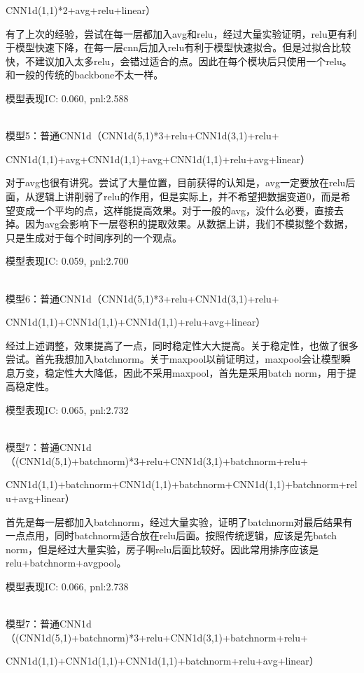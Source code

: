 \documentclass[11pt]{ctexart}
\begin{document}
CNN1d(1,1)*2+avg+relu+linear）

有了上次的经验，尝试在每一层都加入avg和relu，经过大量实验证明，relu更有利于模型快速下降，在每一层cnn后加入relu有利于模型快速拟合。但是过拟合比较快，不建议加入太多relu，会错过适合的点。因此在每个模块后只使用一个relu。和一般的传统的backbone不太一样。

模型表现{\kaishu \small IC: 0.060, pnl:2.588}

~\\
模型5：普通CNN1d（CNN1d(5,1)*3+relu+CNN1d(3,1)+relu+

CNN1d(1,1)+avg+CNN1d(1,1)+avg+CNN1d(1,1)+relu+avg+linear）

对于avg也很有讲究。尝试了大量位置，目前获得的认知是，avg一定要放在relu后面，从逻辑上讲削弱了relu的作用，但是实际上，并不希望把数据变道0，而是希望变成一个平均的点，这样能提高效果。对于一般的avg，没什么必要，直接去掉。因为avg会影响下一层卷积的提取效果。从数据上讲，我们不模拟整个数据，只是生成对于每个时间序列的一个观点。

模型表现{\kaishu \small IC: 0.059, pnl:2.700}

~\\
模型6：普通CNN1d（CNN1d(5,1)*3+relu+CNN1d(3,1)+relu+

CNN1d(1,1)+CNN1d(1,1)+CNN1d(1,1)+relu+avg+linear）

经过上述调整，效果提高了一点，同时稳定性大大提高。关于稳定性，也做了很多尝试。首先我想加入batchnorm。关于maxpool以前证明过，maxpool会让模型瞬息万变，稳定性大大降低，因此不采用maxpool，首先是采用batch norm，用于提高稳定性。

模型表现{\kaishu \small IC: 0.065, pnl:2.732}

~\\
模型7：普通CNN1d（(CNN1d(5,1)+batchnorm)*3+relu+CNN1d(3,1)+batchnorm+relu+

CNN1d(1,1)+batchnorm+CNN1d(1,1)+batchnorm+CNN1d(1,1)+batchnorm+relu+avg+linear）

首先是每一层都加入batchnorm，经过大量实验，证明了batchnorm对最后结果有一点点用，同时batchnorm适合放在relu后面。按照传统逻辑，应该是先batch norm，但是经过大量实验，房子啊relu后面比较好。因此常用排序应该是relu+batchnorm+avgpool。

模型表现{\kaishu \small IC: 0.066, pnl:2.738}


~\\
模型7：普通CNN1d（(CNN1d(5,1)+batchnorm)*3+relu+CNN1d(3,1)+batchnorm+relu+

CNN1d(1,1)+CNN1d(1,1)+CNN1d(1,1)+batchnorm+relu+avg+linear）
\end{document}
